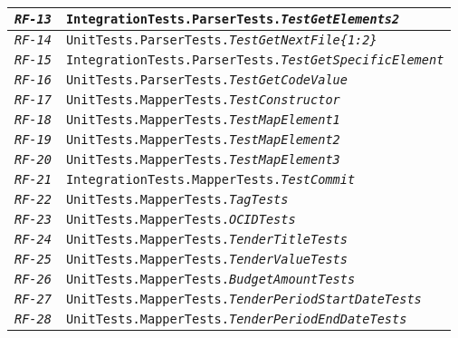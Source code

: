 \begin{longtable}{|| M{3cm} | M{12cm} ||}
                \hline
                    \texttt{\textit{RF-13}} & \texttt{IntegrationTests.ParserTests.\textit{TestGetElements2}} \\
                \hline
                    \texttt{\textit{RF-14}} & \texttt{UnitTests.ParserTests.\textit{TestGetNextFile\{1:2\}}} \\
                \hline
                    \texttt{\textit{RF-15}} & \texttt{IntegrationTests.ParserTests.\textit{TestGetSpecificElement}} \\
                \hline
                    \texttt{\textit{RF-16}} & \texttt{UnitTests.ParserTests.\textit{TestGetCodeValue}} \\
                \hline
                    \texttt{\textit{RF-17}} & \texttt{UnitTests.MapperTests.\textit{TestConstructor}} \\
                \hline
                    \texttt{\textit{RF-18}} & \texttt{UnitTests.MapperTests.\textit{TestMapElement1}} \\
                \hline
                    \texttt{\textit{RF-19}} & \texttt{UnitTests.MapperTests.\textit{TestMapElement2}} \\
                \hline
                    \texttt{\textit{RF-20}} & \texttt{UnitTests.MapperTests.\textit{TestMapElement3}} \\
                \hline
                    \texttt{\textit{RF-21}} & \texttt{IntegrationTests.MapperTests.\textit{TestCommit}} \\
                \hline
                    \texttt{\textit{RF-22}} & \texttt{UnitTests.MapperTests.\textit{TagTests}} \\
                \hline
                    \texttt{\textit{RF-23}} & \texttt{UnitTests.MapperTests.\textit{OCIDTests}} \\
                \hline
                    \texttt{\textit{RF-24}} & \texttt{UnitTests.MapperTests.\textit{TenderTitleTests}} \\
                \hline
                    \texttt{\textit{RF-25}} & \texttt{UnitTests.MapperTests.\textit{TenderValueTests}} \\
                \hline
                    \texttt{\textit{RF-26}} & \texttt{UnitTests.MapperTests.\textit{BudgetAmountTests}} \\
                \hline
                    \texttt{\textit{RF-27}} & \texttt{UnitTests.MapperTests.\textit{TenderPeriodStartDateTests}} \\
                \hline
                    \texttt{\textit{RF-28}} & \texttt{UnitTests.MapperTests.\textit{TenderPeriodEndDateTests}} \\

\end{longtable}
